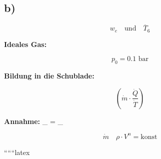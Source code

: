 

\subsection*{b)}

\[
w_e \quad \text{und} \quad \overline{T}_6
\]

\textbf{Ideales Gas:}

\[
p_0 = 0.1 \text{ bar}
\]

\textbf{Bildung in die Schublade:}

\[
\left( \dot{m} \cdot \frac{\dot{Q}}{\dot{T}} \right)
\]

\textbf{Annahme:} \quad {}_{} = _{}

\[
\dot{m} \quad \rho \cdot V^n = \text{konst}
\]

``````latex